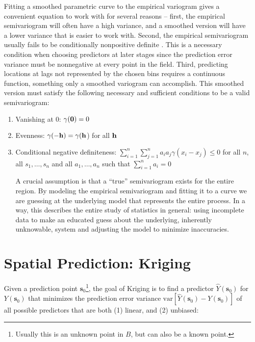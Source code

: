 \documentclass[12pt,twoside]{reedthesis}
\begin{document}
Fitting a smoothed parametric curve to the empirical variogram gives a convenient equation to work with for several reasons -- first, the empirical semivariogram will often have a high variance, and a smoothed version will have a lower variance that is easier to work with. Second, the empirical semivariogram usually fails to be conditionally nonpositive definite \cite{gelfand:2010}. This is a necessary condition when choosing predictors at later stages since the prediction error variance must be nonnegative at every point in the field. Third, predicting locations at lags not represented by the chosen bins requires a continuous function, something only a smoothed variogram can accomplish. This smoothed version must satisfy the following necessary and sufficient conditions to be a valid semivariogram: 

\begin{enumerate}

\item Vanishing at 0: $\gamma(\bold{0}) = 0$
\item Evenness: $\gamma(-\bold{h}) = \gamma(\bold{h}$) for all $\bold{h}$
\item Conditional negative definiteness: $\sum_{i=1}^n \sum_{j=1}^n a_i a_j \gamma(x_i - x_j) \leq 0$ for all $n$, all $s_1, \dots, s_n$ and all $a_1, \dots, a_n$ such that $\sum_{i=1}^n a_i = 0$

A crucial assumption is that a ``true'' semivariogram exists for the entire region. By modeling the empirical semivariogram and fitting it to a curve we are guessing at the underlying model that represents the entire process. In a way, this describes the entire study of statistics in general: using incomplete data to make an educated guess about the underlying, inherently unknowable, system and adjusting the model to minimize inaccuracies.

\end{enumerate}



\section{Spatial Prediction: Kriging}
Given a prediction point $\mathbf{s}_0$\footnote{Usually this is an unknown point in $B$, but can also be a known point.}, the goal of Kriging is to find a predictor $\hat Y(\mathbf{s}_0)$ for $Y(\mathbf{s}_0)$ that minimizes the prediction error variance $\text{var}[\hat Y(\mathbf{s}_0) - Y(\mathbf{s}_0)]$ of all possible predictors that are both (1) linear, and  (2) unbiased:
\end{document}
